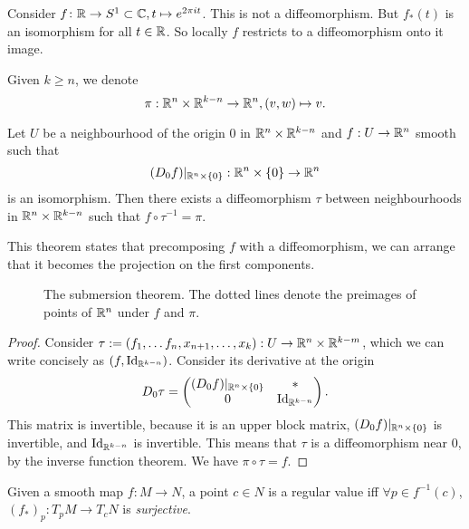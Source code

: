 \begin{eg}
 Consider   $f\colon \mathbb{R} \to S^1\subset \mathbb C, t \mapsto e^{2 \pi it}$.
    This is not a diffeomorphism.
    But $f_*(t)$ is an isomorphism for all $t\in \mathbb{R}$. So locally $f$ restricts to a diffeomorphism onto it image. 
\end{eg}

\filbreak
Given $k \ge  n$, we denote
\[
    \pi: \mathbb{R}^n \times \mathbb{R}^{k-n} \to  \mathbb{R}^n, (v, w) \mapsto  v
.\] 
\begin{lemma}
    Let $U$ be a neighbourhood of the origin $0$ in $\mathbb{R}^n \times \mathbb{R}^{k-n}$ and $f: U \to \mathbb{R}^n$ smooth such that
    \[
        (D_0  f)|_{\mathbb{R}^n \times \{0\} }: \mathbb{R}^{n}\times \{0\}  \to  \mathbb{R}^n
    \] 
    is an isomorphism.
    Then there exists a diffeomorphism $\tau$ between neighbourhoods in $\mathbb{R}^n \times \mathbb{R}^{k-n}$ such that $f  \circ \tau^{-1} = \pi$.
\end{lemma}

This theorem states that precomposing $f$ with a diffeomorphism, we can arrange that it becomes the projection on the first components.
\begin{figure}[ht]
    \centering
    \caption{The submersion theorem. The dotted lines denote the preimages of points of $\mathbb{R}^n$ under $f$ and $\pi$.}
    \label{fig:submersion-theorem}
\end{figure}

\filbreak

\begin{proof}
    Consider $\tau:= (f_1, \ldots f_n, x_{n+1}, \ldots, x_k): U \to  \mathbb{R}^n \times \mathbb{R}^{k-m}$, which we can write concisely as $(f, \text{Id}_{\mathbb{R}^{k-n}})$. Consider its derivative at the origin
    \[
    D_0 \tau = \begin{pmatrix}
        (D_0 f)|_{\mathbb{R}^n \times \{0\} } & * \\
    	 0 & \text{Id}_{\mathbb{R}^{k-n}}
    \end{pmatrix}
    .\] 
    This matrix is invertible, because it is an upper block matrix, $(D_0 f)|_{\mathbb{R}^n \times \{0\} } $ is invertible, and $\text{Id}_{\mathbb{R}^{k-n}}$ is invertible.
        This means that $\tau$ is a diffeomorphism near $0$, by the inverse function theorem.
    We have $ \pi  \circ \tau = f$.
\end{proof}
\begin{definition}
    Given a smooth map $f: M \to  N$, a point $c\in N$ is a regular value iff $\forall p \in f^{-1}(c)$, $(f_*)_p : T_p M \to  T_c N$ is \emph{surjective}.
\end{definition}

